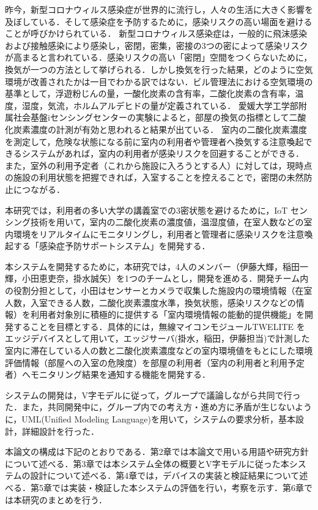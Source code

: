
昨今，新型コロナウィルス感染症が世界的に流行し，人々の生活に大きく影響を及ぼしている．そして感染症を予防するために，感染リスクの高い場面を避けることが呼びかけられている．
新型コロナウィルス感染症は，一般的に飛沫感染および接触感染により感染し，密閉，密集，密接の3つの密によって感染リスクが高まると言われている\cite{qa}．感染リスクの高い「密閉」空間をつくらないために，換気が一つの方法として挙げられる．しかし換気を行った結果，どのように空気環境が改善されたかは一目でわかる訳ではない．ビル管理法における空気環境の基準として，浮遊粉じんの量，一酸化炭素の含有率，二酸化炭素の含有率，温度，湿度，気流，ホルムアルデヒドの量が定義されている\cite{kanki}．
愛媛大学工学部附属社会基盤iセンシングセンターの実験によると，部屋の換気の指標として二酸化炭素濃度の計測が有効と思われると結果が出ている\cite{isence}．
室内の二酸化炭素濃度を測定して，危険な状態になる前に室内の利用者や管理者へ換気する注意喚起できるシステムがあれば，室内の利用者が感染リスクを回避することができる．
また，室外の利用予定者（これから施設に入ろうとする人）に対しては，現時点の施設の利用状態を把握できれば，入室することを控えることで，密閉の未然防止につながる．

本研究では，利用者の多い大学の講義室での3密状態を避けるために，IoT センシング技術を用いて，室内の二酸化炭素の濃度値，温湿度値，在室人数などの室内環境をリアルタイムにモニタリングし，利用者と管理者に感染リスクを注意喚起する「感染症予防サポートシステム」を開発する．

本システムを開発するために，本研究では，4人のメンバー（伊藤大輝，稲田一輝，小田恵吏奈，掛水誠矢）を1つのチームとし，開発を進める．開発チーム内の役割分担として，小田はセンサーとカメラで収集した施設内の環境情報（在室人数，入室できる人数，二酸化炭素濃度水準，換気状態，感染リスクなどの情報）を利用者対象別に積極的に提供する「室内環境情報の能動的提供機能」を開発することを目標とする．具体的には，無線マイコンモジュールTWELITE をエッジデバイスとして用いて，エッジサーバ(掛水，稲田，伊藤担当)で計測した室内に滞在している人の数と二酸化炭素濃度などの室内環境値をもとにした環境評価情報（部屋への入室の危険度）を部屋の利用者（室内の利用者と利用予定者）へモニタリング結果を通知する機能を開発する．

システムの開発は，V字モデルに従って，グループで議論しながら共同で行った．また，共同開発中に，グループ内での考え方・進め方に矛盾が生じないように，UML(Unified Modeling Language)を用いて，システムの要求分析，基本設計，詳細設計を行った．

本論文の構成は下記のとおりである．第2章では本論文で用いる用語や研究方針について述べる．第3章では本システム全体の概要とV字モデルに従った本システムの設計について述べる．第4章では，デバイスの実装と検証結果について述べる．第5章では実装・検証した本システムの評価を行い，考察を示す．第6章では本研究のまとめを行う．
